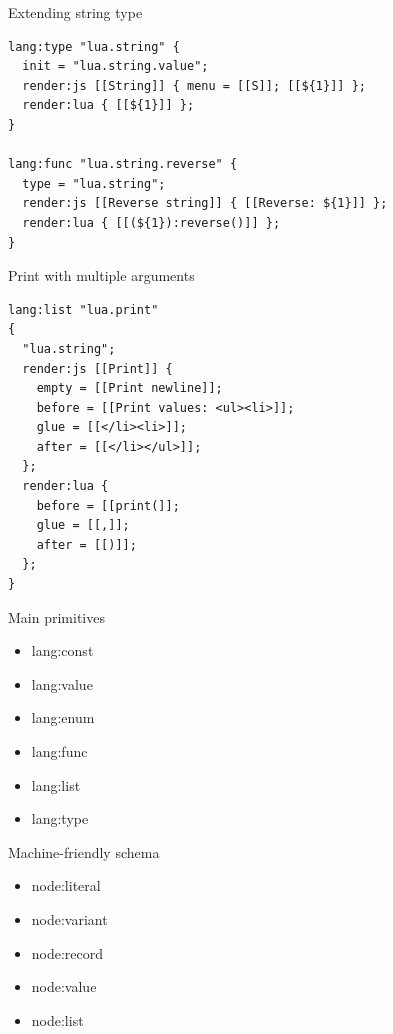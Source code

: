 \documentclass[handout]{beamer}
\begin{document}

\begin{frame}[fragile]{Extending string type}

\begin{verbatim}
lang:type "lua.string" {
  init = "lua.string.value";
  render:js [[String]] { menu = [[S]]; [[${1}]] };
  render:lua { [[${1}]] };
}

lang:func "lua.string.reverse" {
  type = "lua.string";
  render:js [[Reverse string]] { [[Reverse: ${1}]] };
  render:lua { [[(${1}):reverse()]] };
}
\end{verbatim}

\end{frame}


\begin{frame}[fragile]{Print with multiple arguments}

\begin{verbatim}
lang:list "lua.print"
{
  "lua.string";
  render:js [[Print]] {
    empty = [[Print newline]];
    before = [[Print values: <ul><li>]];
    glue = [[</li><li>]];
    after = [[</li></ul>]];
  };
  render:lua {
    before = [[print(]];
    glue = [[,]];
    after = [[)]];
  };
}
\end{verbatim}

\end{frame}


\begin{frame}{Main primitives}

\begin{itemize}
\item lang:const
\item lang:value
\item lang:enum
\item lang:func
\item lang:list
\item lang:type
\end{itemize}

\end{frame}


\begin{frame}{Machine-friendly schema}

\begin{itemize}
\item node:literal
\item node:variant
\item node:record
\item node:value
\item node:list
\end{itemize}

\end{frame}
\end{document}
